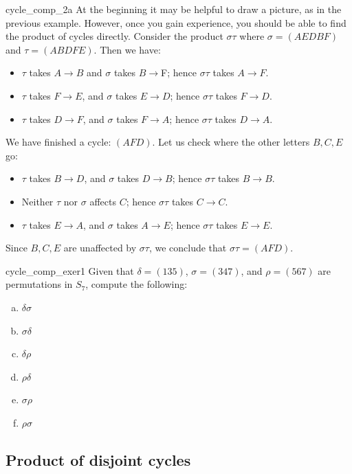 \begin{example}{cycle_comp_2a}
At the beginning it may be helpful to draw a picture, as in the previous example. However, once you gain experience, you should be able to find the product of cycles directly.  Consider the product  $\sigma\tau$ where $\sigma = (AEDBF)$ and $\tau=(ABDFE)$.  Then we have:

\begin{itemize}
\item
$\tau$ takes $A \to B$  and $\sigma$ takes $B \to $F; hence $\sigma \tau$ takes $A \to F$.
\item
$\tau$ takes $F \to E$, and $\sigma$ takes $E \to D$; hence $\sigma \tau$ takes $F \to D$.
\item
$\tau$ takes $D \to F$, and $\sigma$ takes $F \to A$; hence $\sigma \tau$ takes $D \to A$.
\end{itemize}
We have finished a cycle:  $(AFD)$.  Let us check where the other letters $B, C, E$ go:
\begin{itemize}
\item
$\tau$ takes $B \to D$, and $\sigma$ takes $D \to B$; hence $\sigma \tau$ takes $B \to B$.
\item
Neither $\tau$ nor $\sigma$ affects $C$; hence $\sigma \tau$ takes $C \to C$.
\item
$\tau$ takes $E \to A$, and $\sigma$ takes $A \to E$; hence $\sigma \tau$ takes $E \to E$.
\end{itemize}
Since $B, C, E$ are unaffected by $\sigma \tau$, we conclude that $\sigma \tau=(AFD)$.
\end{example}

\begin{exercise}{cycle_comp_exer1}
Given that $\delta = (135)$, $\sigma = (347)$, and $\rho = (567)$ are permutations in $S_7$, compute the following:
\begin{multicols}{3}
\begin{enumerate}[(a)]
\item
$\delta \sigma$
\item
$\sigma \delta$
\item
$\delta \rho$
\item
$\rho \delta$
\item
$\sigma \rho$
\item
$\rho \sigma$
\end{enumerate}
\end{multicols}
\end{exercise}

\subsection{Product of disjoint cycles}

